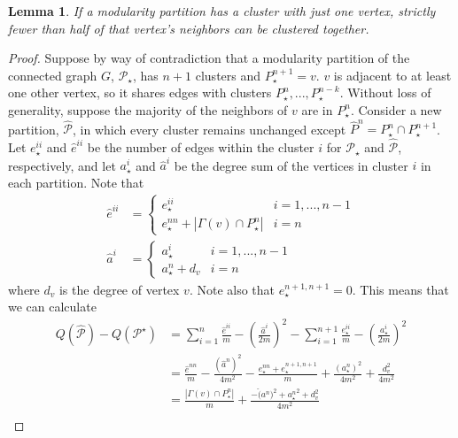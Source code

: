 \documentclass[]{article}
\newtheorem{lemma}[theorem]{Lemma}
\begin{document}
		\begin{lemma}
			 If a modularity partition has a cluster with just one vertex, strictly fewer than half of that vertex's neighbors can be clustered together. 
		\end{lemma}
		\begin{proof}
			Suppose by way of contradiction that a modularity partition of the connected graph $G$, $\mathcal{P}_\star$, has $n+1$ clusters and $P_\star^{n+1}={v}.$ $v$ is adjacent to at least one other vertex, so it shares edges with clusters $P_\star^n,...,P_\star^{n-k}$. Without loss of generality, suppose the majority of the neighbors of $v$ are in $P_\star^n$. Consider a new partition, $\hat{\mathcal{P}}$, in which every cluster remains unchanged except $\hat{P}^n= P_\star^n\cap P_\star^{n+1}$. Let $e^{ii}_\star$ and $\hat{e}^{ii}$ be the number of edges within the cluster $i$ for $\mathcal{P}_\star$ and $\hat{\mathcal{P}}$, respectively, and let $a^i_\star$ and $\hat{a}^i$ be the degree sum of the vertices in cluster $i$ in each partition. Note that
			\begin{equation}
				\begin{split}
					\hat{e}^{ii} &= \begin{cases}
						e^{ii}_\star & i=1,...,n-1\\
						 e^{nn}_\star + |\Gamma(v)\cap P_\star^{n}|& i=n
					\end{cases}\\
					\hat{a}^i &=\begin{cases}
						a^{i}_\star & i=1,...,n-1\\
						a_\star^n+d_{v}& i=n
					\end{cases}
				\end{split}
			\end{equation} 
			where $d_v$ is the degree of vertex $v$. Note also that $e_\star^{n+1,n+1}=0$. This means that we can calculate  \begin{equation}
				\begin{split}
					Q(\hat{\mathcal{P}})-Q(\mathcal{P}^\star)&= \sum_{i=1}^n \frac{\hat e^{ii}}{m}-\left(\frac{\hat a^i}{2m}\right)^2-\sum_{i=1}^{n+1} \frac{e_\star^{ii}}{m}-\left(\frac{a_\star^i}{2m}\right)^2\\
					&=\frac{\hat{e}^{nn}}{m}-\frac{(\hat{a}^n)^2}{4m^2}-\frac{e_\star^{nn}+e_\star^{n+1,n+1}}{m}+\frac{(a^n_\star)^2}{4m^2}+\frac{d_v^2}{4m^2}\\
					&= \frac{|\Gamma(v)\cap P_\star^{n}|}{m}+\frac{-\hat (a^n)^2+{a^n_\star}^2+d_v^2}{4m^2}\\

\end{split}
\end{equation}
\end{proof}
\end{document}
